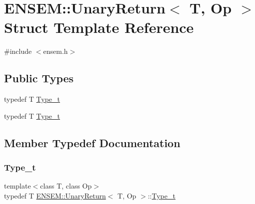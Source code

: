 \hypertarget{structENSEM_1_1UnaryReturn}{}\section{E\+N\+S\+EM\+:\+:Unary\+Return$<$ T, Op $>$ Struct Template Reference}
\label{structENSEM_1_1UnaryReturn}


{\ttfamily \#include $<$ensem.\+h$>$}

\subsection*{Public Types}
\begin{DoxyCompactItemize}
\item 
typedef T \mbox{\hyperlink{structENSEM_1_1UnaryReturn_a16a257c6ea03664cc3e42cbfe2ca219d}{Type\+\_\+t}}
\item 
typedef T \mbox{\hyperlink{structENSEM_1_1UnaryReturn_a16a257c6ea03664cc3e42cbfe2ca219d}{Type\+\_\+t}}
\end{DoxyCompactItemize}


\subsection{Member Typedef Documentation}
\mbox{\label{structENSEM_1_1UnaryReturn_a16a257c6ea03664cc3e42cbfe2ca219d}} 
\subsubsection{\texorpdfstring{Type\_t}{Type\_t}\hspace{0.1cm}{\footnotesize\ttfamily [1/2]}}
{\footnotesize\ttfamily template$<$class T, class Op$>$ \\
typedef T \mbox{\hyperlink{structENSEM_1_1UnaryReturn}{E\+N\+S\+E\+M\+::\+Unary\+Return}}$<$ T, Op $>$\+::\mbox{\hyperlink{structENSEM_1_1UnaryReturn_a16a257c6ea03664cc3e42cbfe2ca219d}{Type\+\_\+t}}}

\mbox{\label{structENSEM_1_1UnaryReturn_a16a257c6ea03664cc3e42cbfe2ca219d}} 
